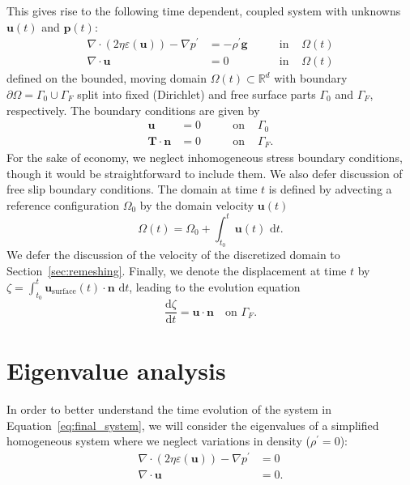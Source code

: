 \documentclass[preprint,12pt,authoryear]{elsarticle}
\begin{document}
This gives rise to the following time dependent, coupled system with unknowns $\mathbf{u}(t)$ and $\mathbf{p}(t)$:
\begin{equation}
\begin{aligned}
\nabla \cdot \left( 2 \eta \varepsilon( \mathbf{u} ) \right) - \nabla p^\prime &= - \rho^\prime \mathbf{g} \qquad &\text{in } &\Omega(t)\\
\nabla \cdot \mathbf{u} &= 0  \qquad &\text{in } &\Omega(t)
\end{aligned}
\label{eq:final_system}
\end{equation}
defined on the bounded, moving domain $\Omega(t)\subset \mathbb{R}^d$ with boundary $\partial \Omega = \Gamma_0 \cup \Gamma_F$
split into fixed (Dirichlet) and free surface parts $\Gamma_0$ and $\Gamma_F$, respectively.
The boundary conditions are given by
\begin{equation}
\begin{aligned}
\mathbf{u} &= 0 &\qquad \text{on } &\Gamma_0 \\
\mathbf{T}\cdot \mathbf{n} &= 0 &\qquad \text{on } &\Gamma_F.
\end{aligned}
\end{equation}
For the sake of economy, we neglect inhomogeneous stress boundary conditions, though it would be straightforward to include them.
We also defer discussion of free slip boundary conditions.
The domain at time $t$ is defined by advecting a reference configuration $\Omega_0$ by the domain velocity $\mathbf{u}(t)$
\begin{equation}
 \Omega(t) = \Omega_0 + \int_{t_0}^t \mathbf{u}(t) \text{ d}t.
 \label{eq:domain_evolution}
\end{equation}
We defer the discussion of the velocity of the discretized domain to Section~\ref{sec:remeshing}.
Finally, we denote the displacement at time $t$ by $\zeta = \int_{t_0}^t \mathbf{u}_\mathrm{surface}(t)\cdot \mathbf{n} \text{ d}t$, leading to the evolution
equation
\begin{equation}
\frac{\text{d} \zeta}{\text{d}t} = \mathbf{u \cdot \mathbf{n}} \quad \textrm{on  }  \Gamma_F.
\label{eq:surface_evolution}
\end{equation}



\section{Eigenvalue analysis}
\label{sec:eigenvalue}

In order to better understand the time evolution of the system in Equation~\eqref{eq:final_system},
we will consider the eigenvalues of a simplified homogeneous system where we neglect variations in density ($\rho^\prime = 0$):
\begin{equation}
\begin{aligned}
\nabla \cdot \left( 2 \eta \varepsilon( \mathbf{u} ) \right) - \nabla p^\prime &= 0 \\
\nabla \cdot \mathbf{u} &= 0.
\end{aligned}
\label{eq:homogeneous_stokes}
\end{equation}
\end{document}
